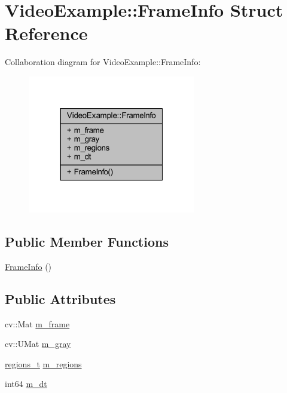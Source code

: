 \hypertarget{struct_video_example_1_1_frame_info}{}\section{Video\+Example\+:\+:Frame\+Info Struct Reference}
\label{struct_video_example_1_1_frame_info}


Collaboration diagram for Video\+Example\+:\+:Frame\+Info\+:\nopagebreak
\begin{figure}[H]
\begin{center}
\leavevmode
\includegraphics[width=208pt]{struct_video_example_1_1_frame_info__coll__graph}
\end{center}
\end{figure}
\subsection*{Public Member Functions}
\begin{DoxyCompactItemize}
\item 
\mbox{\hyperlink{struct_video_example_1_1_frame_info_ae128997d5f216c7acec8fa0653481546}{Frame\+Info}} ()
\end{DoxyCompactItemize}
\subsection*{Public Attributes}
\begin{DoxyCompactItemize}
\item 
cv\+::\+Mat \mbox{\hyperlink{struct_video_example_1_1_frame_info_ace63373cca952f2c7f281b18220f9f8c}{m\+\_\+frame}}
\item 
cv\+::\+U\+Mat \mbox{\hyperlink{struct_video_example_1_1_frame_info_ad7354c359e618ccc2febcfd50e6edb15}{m\+\_\+gray}}
\item 
\mbox{\hyperlink{defines_8h_a01db0de56a20f4342820a093c5154536}{regions\+\_\+t}} \mbox{\hyperlink{struct_video_example_1_1_frame_info_aa4f6d562d893f578ad71144b2145fd50}{m\+\_\+regions}}
\item 
int64 \mbox{\hyperlink{struct_video_example_1_1_frame_info_a1f0a32e6ab3a40b1173f73767523372f}{m\+\_\+dt}}
\end{DoxyCompactItemize}


